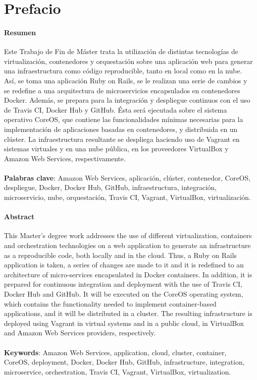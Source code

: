 \chapter{Prefacio}

\subsubsection{Resumen}
Este Trabajo de Fin de Máster trata la utilización de distintas tecnologías de virtualización, contenedores y orquestación sobre una aplicación web para generar una infraestructura como código reproducible, tanto en local como en la nube. Así, se toma una aplicación Ruby on Rails, se le realizan una serie de cambios y se redefine a una arquitectura de microservicios encapsulados en contenedores Docker. Además, se prepara para la integración y despliegue continuos con el uso de Travis CI, Docker Hub y GitHub. Ésta será ejecutada sobre el sistema operativo CoreOS, que contiene las funcionalidades mínimas necesarias para la implementación de aplicaciones basadas en contenedores, y distribuida en un clúster. La infraestructura resultante se despliega haciendo uso de Vagrant en sistemas virtuales y en una nube pública, en los proveedores VirtualBox y Amazon Web Services, respectivamente. 
\\
\\
\textbf{Palabras clave}: Amazon Web Services, aplicación, clúster, contenedor, CoreOS, despliegue, Docker, Docker Hub, GitHub, infraestructura, integración, microservicio, nube, orquestación, Travis CI, Vagrant, VirtualBox, virtualización.

\subsubsection{Abstract}
This Master's degree work addresses the use of different virtualization, containers and orchestration technologies on a web application to generate an infrastructure as a reproducible code, both locally and in the cloud. Thus, a Ruby on Rails application is taken, a series of changes are made to it and it is redefined to an architecture of micro-services encapsulated in Docker containers. In addition, it is prepared for continuous integration and deployment with the use of Travis CI, Docker Hub and GitHub. It will be executed on the CoreOS operating system, which contains the functionality needed to implement container-based applications, and it will be distributed in a cluster. The resulting infrastructure is deployed using Vagrant in virtual systems and in a public cloud, in VirtualBox and Amazon Web Services providers, respectively.
\\
\\
\textbf{Keywords}: Amazon Web Services, application, cloud, cluster, container, CoreOS, deployment, Docker, Docker Hub, GitHub, infrastructure, integration, microservice, orchestration, Travis CI, Vagrant, VirtualBox, virtualization.
